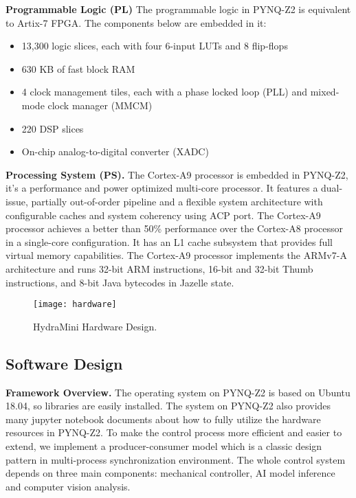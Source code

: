 \textbf{Programmable Logic (PL)} The programmable logic in PYNQ-Z2 is equivalent to Artix-7 FPGA\cite{2019artix}. The components below are embedded in it:

\begin{itemize}
\item{13,300 logic slices, each with four 6-input LUTs and 8 flip-flops }
\item{630 KB of fast block RAM }
\item{4 clock management tiles, each with a phase locked loop (PLL) and mixed-mode clock manager (MMCM) }
\item{220 DSP slices }
\item{On-chip analog-to-digital converter (XADC) }
\end{itemize}

\textbf{Processing System (PS).} The Cortex-A9\cite{2019arma9} processor is embedded in PYNQ-Z2, it's a performance and power optimized multi-core processor. It features a dual-issue, partially out-of-order pipeline and a flexible system architecture with configurable caches and system coherency using ACP port. The Cortex-A9 processor achieves a better than 50\% performance over the Cortex-A8 processor in a single-core configuration. It has an L1 cache subsystem that provides full virtual memory capabilities. The Cortex-A9 processor implements the ARMv7-A architecture and runs 32-bit ARM instructions, 16-bit and 32-bit Thumb instructions, and 8-bit Java bytecodes in Jazelle state.

\begin{figure}[t]
    \centering
    \texttt{[image: hardware]}
    \caption{HydraMini Hardware Design.}
    \label{fig:hardware}
\end{figure}

\subsection{Software Design}
\textbf{Framework Overview.} The operating system on PYNQ-Z2 is based on Ubuntu 18.04, so libraries are easily installed. The system on PYNQ-Z2 also provides many jupyter notebook documents about how to fully utilize the hardware resources in PYNQ-Z2. To make the control process more efficient and easier to extend, we implement a producer-consumer model\cite{producerconsumer} which is a classic design pattern in multi-process synchronization environment. The whole control system depends on three main components: mechanical controller, AI model inference and computer vision analysis. 

